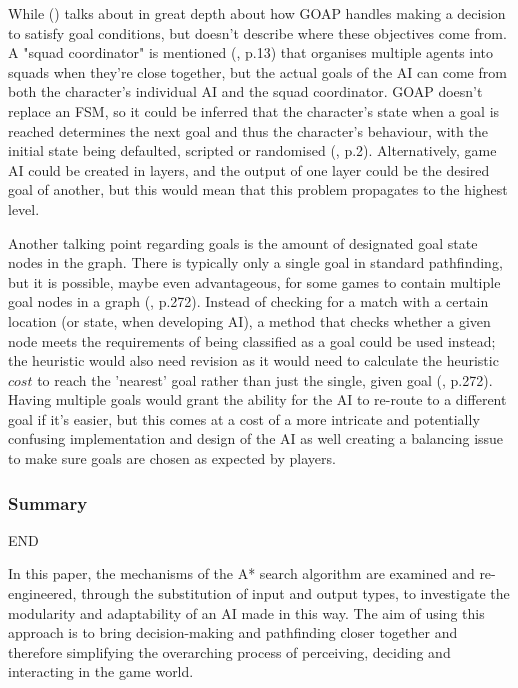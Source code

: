 \documentclass[11pt, a4paper]{article}
\begin{document}
While \citeauthor{orkin2003applying} (\citeyear{orkin2003applying}) talks about in great depth about how GOAP handles making a decision to satisfy goal conditions, but doesn't describe where these objectives come from. A "squad coordinator" is mentioned (\cite{orkin2003applying}, p.13) that organises multiple agents into squads when they're close together, but the actual goals of the AI can come from both the character's individual AI and the squad coordinator. GOAP doesn't replace an FSM, so it could be inferred that the character's state when a goal is reached determines the next goal and thus the character's behaviour, with the initial state being defaulted, scripted or randomised (\cite{orkin2003applying}, p.2). Alternatively, game AI could be created in layers, and the output of one layer could be the desired goal of another, but this would mean that this problem propagates to the highest level. 

Another talking point regarding goals is the amount of designated goal state nodes in the graph. There is typically only a single goal in standard pathfinding, but it is possible, maybe even advantageous, for some games to contain multiple goal nodes in a graph (\cite{millington2019ai}, p.272). Instead of checking for a match with a certain location (or state, when developing AI), a method that checks whether a given node meets the requirements of being classified as a goal could be used instead; the heuristic would also need revision as it would need to calculate the heuristic $cost$ to reach the 'nearest' goal rather than just the single, given goal (\cite{millington2019ai}, p.272). Having multiple goals would grant the ability for the AI to re-route to a different goal if it's easier, but this comes at a cost of a more intricate and potentially confusing implementation and design of the AI as well creating a balancing issue to make sure goals are chosen as expected by players.

\subsubsection{Summary}

END

In this paper, the mechanisms of the A* search algorithm are examined and re-engineered, through the substitution of input and output types, to investigate the modularity and adaptability of an AI made in this way. The aim of using this approach is to bring decision-making and pathfinding closer together and therefore simplifying the overarching process of perceiving, deciding and interacting in the game world.
\end{document}
